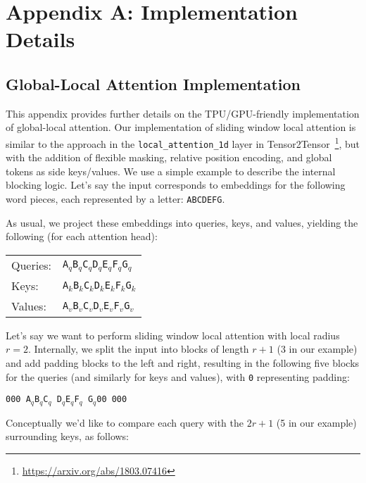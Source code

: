 \documentclass[11pt,a4paper]{article}
\begin{document}
\clearpage

\appendix

\section*{Appendix A: Implementation Details}\label{app:implementation}

\subsection*{Global-Local Attention Implementation}

This appendix provides further details on the TPU/GPU-friendly implementation of global-local attention. 
Our implementation of sliding window local attention is similar to the approach in the \texttt{local\_attention\_1d} layer in Tensor2Tensor~\footnote{\url{https://arxiv.org/abs/1803.07416}}, but with the addition of flexible masking, relative position encoding, and global tokens as side keys/values. We use a simple example to describe the internal blocking logic. Let's say the input corresponds to embeddings for the following word pieces, each represented by a letter: \texttt{ABCDEFG}.

As usual, we project these embeddings into queries, keys, and values, yielding the following (for each attention head):

\begin{tabular}{ll} 
Queries: &  \texttt{A$_q$B$_q$C$_q$D$_q$E$_q$F$_q$G$_q$} \\
Keys:    &  \texttt{A$_k$B$_k$C$_k$D$_k$E$_k$F$_k$G$_k$} \\
Values:  &  \texttt{A$_v$B$_v$C$_v$D$_v$E$_v$F$_v$G$_v$} \\
\end{tabular}

Let's say we want to perform sliding window local attention with local radius $r=2$. Internally, we split the input into blocks of length $r+1$ (3 in our example) and add padding blocks to the left and right, resulting in the following five blocks for the queries (and similarly for keys and values), with \texttt{0} representing padding:

\texttt{000 A$_q$B$_q$C$_q$ D$_q$E$_q$F$_q$ G$_q$00 000}

Conceptually we'd like to compare each query with the $2r+1$ (5 in our example) surrounding keys, as follows:
\end{document}
